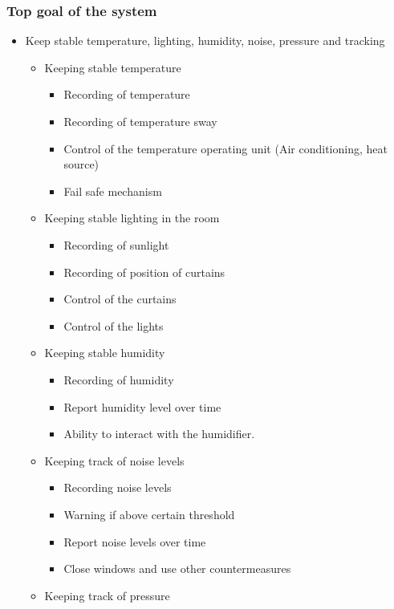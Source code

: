 \documentclass[../document]{subfiles}
\begin{document}
\subsubsection{Top goal of the system}
\begin{itemize}
	\item
	Keep stable temperature, lighting, humidity, noise, pressure and tracking
	\begin{itemize}
		\item
		Keeping stable temperature
		\begin{itemize}
			\item
			Recording of temperature
			\item
			Recording of temperature sway
			\item
			Control of the temperature operating unit (Air conditioning, heat source)
			\item
			Fail safe mechanism
		\end{itemize}
		\item
		Keeping stable lighting in the room
		\begin{itemize}
			\item
			Recording of sunlight
			\item
			Recording of position of curtains
			\item
			Control of the curtains
			\item
			Control of the lights
		\end{itemize}
		\item
		Keeping stable humidity
		\begin{itemize}
			\item
			Recording of humidity
			\item
			Report humidity level over time
			\item
			Ability to interact with the humidifier.
		\end{itemize}
		\item
		Keeping track of noise levels
		\begin{itemize}
			\item
			Recording noise levels
			\item
			Warning if above certain threshold 
			\item
			Report noise levels over time 
			\item
			Close windows and use other countermeasures
		\end{itemize}
		\item
		Keeping track of pressure
		\begin{itemize}

\end{itemize}
\end{itemize}
\end{itemize}
\end{document}
